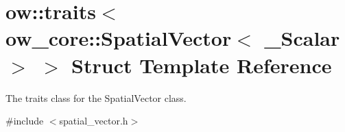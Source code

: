 \hypertarget{structow_1_1traits_3_01ow__core_1_1SpatialVector_3_01__Scalar_01_4_01_4}{}\section{ow\+:\+:traits$<$ ow\+\_\+core\+:\+:Spatial\+Vector$<$ \+\_\+\+Scalar $>$ $>$ Struct Template Reference}
\label{structow_1_1traits_3_01ow__core_1_1SpatialVector_3_01__Scalar_01_4_01_4}


The traits class for the Spatial\+Vector class.  




{\ttfamily \#include $<$spatial\+\_\+vector.\+h$>$}

